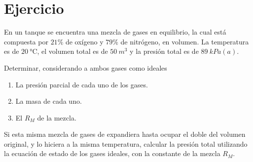 \section{Ejercicio}\label{ej:Chap03Ejercicio03}
En un tanque se encuentra una mezcla de gases en equilibrio, la cual está compuesta por $21\%$ de oxígeno y $79\%$ de nitrógeno, en volumen. La temperatura es de $\SI{20}{\celsius}$, el volumen total es de $\SI{50}{m^3}$ y la presión total es de $\SI{89}{kPa(a)}$.

Determinar, considerando a ambos gases como ideales
\begin{enumerate}
    \item La presión parcial de cada uno de los gases.
    \item La masa de cada uno.
    \item El $R_M$ de la mezcla.
\end{enumerate}
Si esta misma mezcla de gases de expandiera hasta ocupar el doble del volumen original, y lo hiciera a la misma temperatura, calcular la presión total utilizando la ecuación de estado de los gases ideales, con la constante de la mezcla $R_M$.